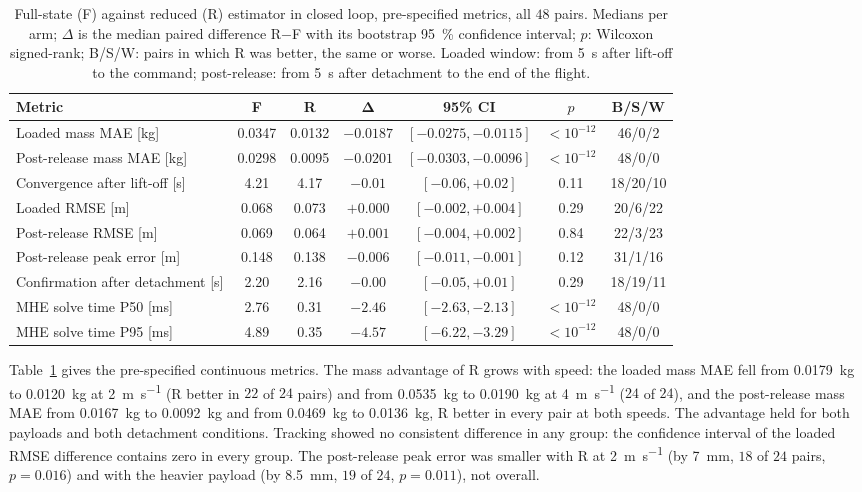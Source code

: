 \begin{spacing}{1.5}
\begin{table}[ht]
\centering
\caption[Full-state against reduced estimator in closed loop]{Full-state (F)
against reduced (R) estimator in closed loop, pre-specified metrics, all $48$
pairs. Medians per arm; $\Delta$ is the median paired difference R$-$F with its
bootstrap \SI{95}{\percent} confidence interval; $p$: Wilcoxon signed-rank;
B/S/W: pairs in which R was better, the same or worse. Loaded window: from
\SI{5}{\second} after lift-off to the command; post-release: from \SI{5}{\second}
after detachment to the end of the flight.}
\label{tab:fr-prereg}
\footnotesize
\setlength{\tabcolsep}{3pt}
\begin{tabular}{@{}l c c c c c c@{}}
\toprule
\textbf{Metric} & \textbf{F} & \textbf{R} & $\bm\Delta$ & \textbf{95\% CI} & $p$ & \textbf{B/S/W} \\
\midrule
Loaded mass MAE [kg]          & 0.0347 & 0.0132 & $-0.0187$ & $[-0.0275, -0.0115]$ & $<10^{-12}$ & 46/0/2 \\
Post-release mass MAE [kg]    & 0.0298 & 0.0095 & $-0.0201$ & $[-0.0303, -0.0096]$ & $<10^{-12}$ & 48/0/0 \\
Convergence after lift-off [s] & 4.21  & 4.17   & $-0.01$   & $[-0.06, +0.02]$     & 0.11  & 18/20/10 \\
Loaded RMSE [m]               & 0.068  & 0.073  & $+0.000$  & $[-0.002, +0.004]$   & 0.29  & 20/6/22 \\
Post-release RMSE [m]         & 0.069  & 0.064  & $+0.001$  & $[-0.004, +0.002]$   & 0.84  & 22/3/23 \\
Post-release peak error [m]   & 0.148  & 0.138  & $-0.006$  & $[-0.011, -0.001]$   & 0.12  & 31/1/16 \\
Confirmation after detachment [s] & 2.20 & 2.16 & $-0.00$  & $[-0.05, +0.01]$     & 0.29  & 18/19/11 \\
MHE solve time P50 [ms]       & 2.76   & 0.31   & $-2.46$   & $[-2.63, -2.13]$     & $<10^{-12}$ & 48/0/0 \\
MHE solve time P95 [ms]       & 4.89   & 0.35   & $-4.57$   & $[-6.22, -3.29]$     & $<10^{-12}$ & 48/0/0 \\
\bottomrule
\end{tabular}
\end{table}

Table~\ref{tab:fr-prereg} gives the pre-specified continuous metrics. The mass
advantage of R grows with speed: the loaded mass MAE fell from
\SI{0.0179}{\kg} to \SI{0.0120}{\kg} at \SI{2}{\meter\per\second} (R better in
$22$ of $24$ pairs) and from \SI{0.0535}{\kg} to \SI{0.0190}{\kg} at
\SI{4}{\meter\per\second} ($24$ of $24$), and the post-release mass MAE from
\SI{0.0167}{\kg} to \SI{0.0092}{\kg} and from \SI{0.0469}{\kg} to
\SI{0.0136}{\kg}, R better in every pair at both speeds. The advantage held for
both payloads and both detachment conditions. Tracking showed no consistent
difference in any group: the confidence interval of the loaded RMSE difference
contains zero in every group. The post-release peak error was smaller with R
at \SI{2}{\meter\per\second} (by \SI{7}{\milli\meter}, $18$ of $24$ pairs,
$p=0.016$) and with the heavier payload (by \SI{8.5}{\milli\meter}, $19$ of $24$,
$p=0.011$), not overall.


\end{spacing}
